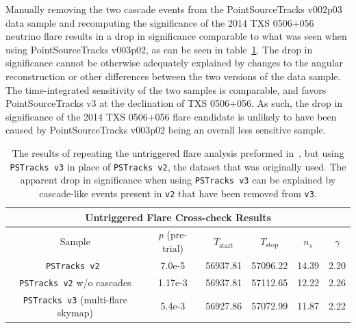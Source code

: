 Manually removing the two cascade events from the PointSourceTracks v002p03 data sample and recomputing the significance of the 2014 TXS 0506+056 neutrino flare results in a drop in significance comparable to what was seen when using PointSourceTracks v003p02, as can be seen in table~\ref{tab:TXSCrossChecks}. The drop in significance cannot be otherwise adequately explained by changes to the angular reconstruction or other differences between the two versions of the data sample. The time-integrated sensitivity of the two samples is comparable, and favors PointSourceTracks v3 at the declination of TXS 0506+056. As such, the drop in significance of the 2014 TXS 0506+056 flare candidate is unlikely to have been caused by PointSourceTracks v003p02 being an overall less sensitive sample.

\begin{table}[h]
\centering
\begin{tabular}{cccccc}
\multicolumn{6}{c}{Untriggered Flare Cross-check Results} \\[0.1cm]
\hline
\hline
Sample & $p$ (pre-trial) & $T_\text{start}$ & $T_\text{stop}$ & $n_s$ & $\gamma$ \\ 
\hline
\texttt{PSTracks v2}~\cite{TXS_Archival} & 7.0e-5 & 56937.81 & 57096.22 & 14.39 & 2.20  \\
\texttt{PSTracks v2} w/o cascades & 1.17e-3 & 56937.81 & 57112.65 & 12.22 & 2.26 \\
\texttt{PSTracks v3} (multi-flare skymap) & 5.4e-3 & 56927.86 & 57072.99 & 11.87 & 2.22\\
\hline
\hline
\end{tabular}
\caption[]{The results of repeating the untriggered flare analysis preformed in~\cite{TXS_Archival}, but using {\tt PSTracks v3} in place of {\tt PSTracks v2}, the dataset that was originally used. The apparent drop in significance when using {\tt PSTracks v3} can be explained by cascade-like events present in {\tt v2} that have been removed from {\tt v3}.}\label{tab:TXSCrossChecks}
\end{table}


